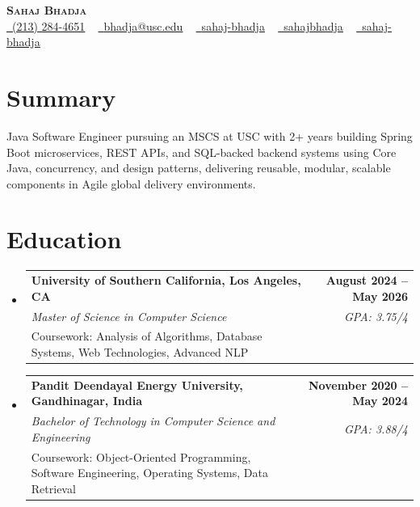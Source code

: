 \documentclass[letterpaper,10pt]{article}
\makeatletter
\newcommand{\resumeEduSubheading}[5]{\vspace{-1pt}\item\begin{tabular*}{1.0\textwidth}[t]{l@{\extracolsep{\fill}}r}\textbf{#1} & \textbf{\small #2} \\\textit{\small #3} & \textit{\small #4} \\\small #5 & \\\end{tabular*}\vspace{-4pt}}
\newcommand{\resumeSubHeadingListStart}{\begin{itemize}[leftmargin=0.0in, label={}]}
\newcommand{\resumeSubHeadingListEnd}{\end{itemize}}
\makeatother
\begin{document}
\begin{center}
{\Huge \scshape \textbf{Sahaj Bhadja}} \\ \vspace{1pt}
\small \href{tel:(213) 284-4651}{\faPhone\ \underline{(213) 284-4651}} ~ \href{mailto: bhadja@usc.edu}{\raisebox{-0.2\height}\faEnvelope\ \underline{bhadja@usc.edu}} ~
\href{https://www.linkedin.com/in/sahaj-bhadja/}{\raisebox{-0.2\height}\faLinkedin\ \underline{sahaj-bhadja}} ~ \href{https://github.com/SAHAJ-BHADJA}{\raisebox{-0.2\height}\faGithub\ \underline{sahajbhadja}} ~
\href{https://sahaj-bhadja.vercel.app/}{\raisebox{-0.2\height}\faGlobe\ \underline{sahaj-bhadja}}
\end{center}
\vspace{-16pt}
\section{Summary}
\begin{itemize}[leftmargin=0.15in, label={}]
\small{\item{Java Software Engineer pursuing an MSCS at USC with 2+ years building Spring Boot microservices, REST APIs, and SQL-backed backend systems using Core Java, concurrency, and design patterns, delivering reusable, modular, scalable components in Agile global delivery environments.}}
\end{itemize}
\vspace{-6pt}
\section{Education}
\resumeSubHeadingListStart
\resumeEduSubheading{University of Southern California, Los Angeles, CA}{August 2024 -- May 2026}{Master of Science in Computer Science}{GPA: 3.75/4}{Coursework: Analysis of Algorithms, Database Systems, Web Technologies, Advanced NLP}
\vspace{-9pt}
\resumeEduSubheading{Pandit Deendayal Energy University, Gandhinagar, India}{November 2020 -- May 2024}{Bachelor of Technology in Computer Science and Engineering}{GPA: 3.88/4}{Coursework: Object-Oriented Programming, Software Engineering, Operating Systems, Data Retrieval}
\resumeSubHeadingListEnd
\vspace{-6pt}
\end{document}
